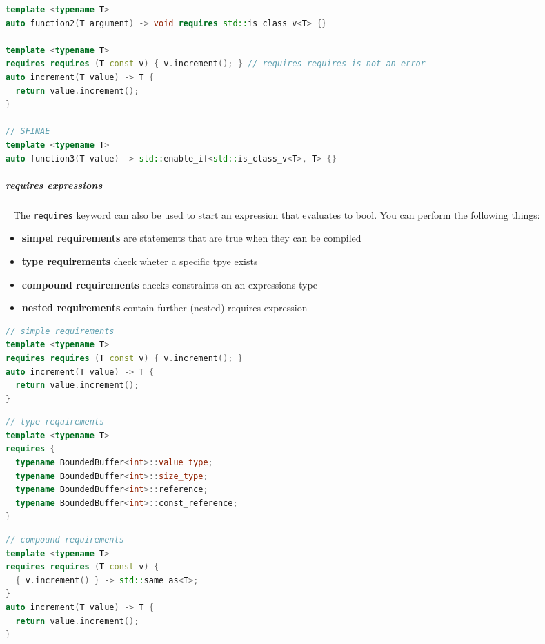 \documentclass[11pt,twoside,landscape]{article}
\begin{document}
\begin{multicols}{2}
\begin{lstlisting}[language=c++,label=lst:constraints-vs-sfinae,caption={constraints vs SFINAE},captionpos=b,numbers=none]
template <typename T>
auto function2(T argument) -> void requires std::is_class_v<T> {}

template <typename T>
requires requires (T const v) { v.increment(); } // requires requires is not an error
auto increment(T value) -> T {
  return value.increment();
}

// SFINAE
template <typename T>
auto function3(T value) -> std::enable_if<std::is_class_v<T>, T> {}
\end{lstlisting}

\subparagraph{requires expressions} \
\label{sec:org07af21c}
The \texttt{requires} keyword can also be used to start an expression that evaluates to bool.
You can perform the following things:
\begin{itemize}
\item \textbf{simpel requirements} are statements that are true when they can be compiled
\item \textbf{type requirements} check wheter a specific tpye exists
\item \textbf{compound requirements} checks constraints on an expressions type
\item \textbf{nested requirements} contain further (nested) requires expression
\end{itemize}


\begin{lstlisting}[language=c++,label=lst:simple-requirements-examples,caption={simple requirements example},captionpos=b,numbers=none]
// simple requirements
template <typename T>
requires requires (T const v) { v.increment(); }
auto increment(T value) -> T {
  return value.increment();
}
\end{lstlisting}

\begin{lstlisting}[language=c++,label=lst:type-requirements-example,caption={type requirements example},captionpos=b,numbers=none]
// type requirements
template <typename T>
requires {
  typename BoundedBuffer<int>::value_type;
  typename BoundedBuffer<int>::size_type;
  typename BoundedBuffer<int>::reference;
  typename BoundedBuffer<int>::const_reference;
}
\end{lstlisting}

\begin{lstlisting}[language=c++,label=lst:compound-requirements-exmaple,caption={Compound requirements exmaple},captionpos=b,numbers=none]
// compound requirements
template <typename T>
requires requires (T const v) {
  { v.increment() } -> std::same_as<T>;
}
auto increment(T value) -> T {
  return value.increment();
}


\end{lstlisting}
\end{multicols}
\end{document}
